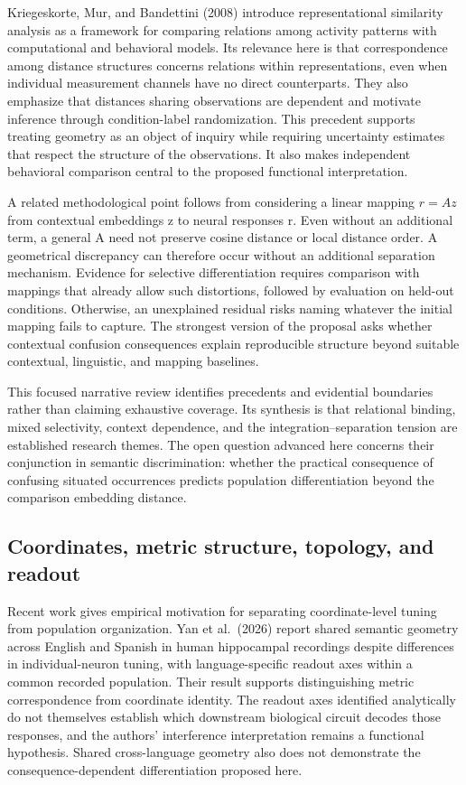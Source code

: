 \documentclass[11pt]{article}
\begin{document}
Kriegeskorte, Mur, and Bandettini (2008) introduce representational
similarity analysis as a framework for comparing relations among
activity patterns with computational and behavioral models. Its
relevance here is that correspondence among distance structures concerns
relations within representations, even when individual measurement
channels have no direct counterparts. They also emphasize that distances
sharing observations are dependent and motivate inference through
condition-label randomization. This precedent supports treating geometry
as an object of inquiry while requiring uncertainty estimates that
respect the structure of the observations. It also makes independent
behavioral comparison central to the proposed functional interpretation.

A related methodological point follows from considering a linear mapping
\(r=Az\) from contextual embeddings z to neural responses r. Even
without an additional term, a general A need not preserve cosine
distance or local distance order. A geometrical discrepancy can
therefore occur without an additional separation mechanism. Evidence for
selective differentiation requires comparison with mappings that already
allow such distortions, followed by evaluation on held-out conditions.
Otherwise, an unexplained residual risks naming whatever the initial
mapping fails to capture. The strongest version of the proposal asks
whether contextual confusion consequences explain reproducible structure
beyond suitable contextual, linguistic, and mapping baselines.

This focused narrative review identifies precedents and evidential
boundaries rather than claiming exhaustive coverage. Its synthesis is
that relational binding, mixed selectivity, context dependence, and the
integration--separation tension are established research themes. The
open question advanced here concerns their conjunction in semantic
discrimination: whether the practical consequence of confusing situated
occurrences predicts population differentiation beyond the comparison
embedding distance.

\hypertarget{coordinates-metric-structure-topology-and-readout}{%
\subsection{Coordinates, metric structure, topology, and
readout}\label{coordinates-metric-structure-topology-and-readout}}

Recent work gives empirical motivation for separating coordinate-level
tuning from population organization. Yan et al.~(2026) report shared
semantic geometry across English and Spanish in human hippocampal
recordings despite differences in individual-neuron tuning, with
language-specific readout axes within a common recorded population.
Their result supports distinguishing metric correspondence from
coordinate identity. The readout axes identified analytically do not
themselves establish which downstream biological circuit decodes those
responses, and the authors' interference interpretation remains a
functional hypothesis. Shared cross-language geometry also does not
demonstrate the consequence-dependent differentiation proposed here.
\end{document}
